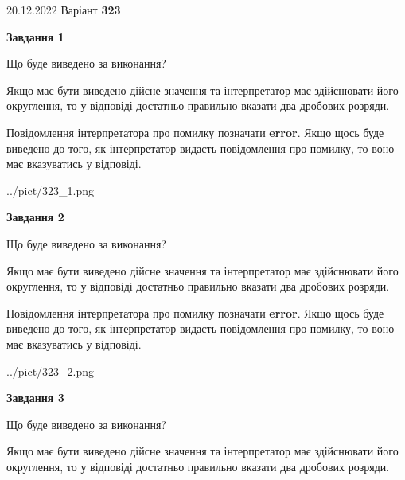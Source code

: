 \documentclass[12pt, ukrainian]{article}
\begin{document}
{20.12.2022 Варіант \No \textbf { 323 }\par}
{
\begin {Large}

{\begin {center}\textbf{Завдання 1}\end {center}}\par
Що буде виведено за виконання? \par

Якщо має бути виведено дійсне значення та інтерпретатор має здійснювати його округлення, 
то у відповіді достатньо правильно вказати два дробових розряди.

Повідомлення інтерпретатора про помилку позначати \textbf{error}.
Якщо щось буде виведено до того, як інтерпретатор видасть повідомлення про помилку, 
то воно має вказуватись у відповіді. \par

\begin{center}
	{../pict/323_1.png}
\end{center}
\newpage

{\begin {center}\textbf{Завдання 2}\end {center}}\par
Що буде виведено за виконання? \par

Якщо має бути виведено дійсне значення та інтерпретатор має здійснювати його округлення, 
то у відповіді достатньо правильно вказати два дробових розряди.

Повідомлення інтерпретатора про помилку позначати \textbf{error}.
Якщо щось буде виведено до того, як інтерпретатор видасть повідомлення про помилку, 
то воно має вказуватись у відповіді. \par

\begin{center}
	{../pict/323_2.png}
\end{center}
\newpage

{\begin {center}\textbf{Завдання 3}\end {center}}\par
Що буде виведено за виконання? \par

Якщо має бути виведено дійсне значення та інтерпретатор має здійснювати його округлення, 
то у відповіді достатньо правильно вказати два дробових розряди.


\end{Large}}
\end{document}
